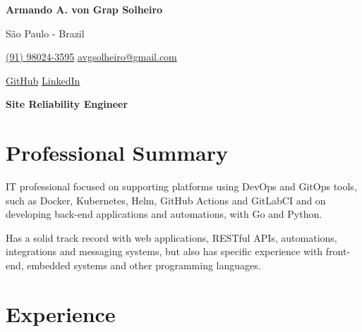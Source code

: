 \documentclass[a4paper,10pt]{article}
\begin{document}

\noindent
\begin{minipage}[t]{0.5\textwidth}
\textbf{\Large Armando A. von Grap Solheiro}

\vspace{0.4em}

\end{minipage}%
\begin{minipage}[t]{0.5\textwidth}
\raggedleft

São Paulo - Brazil

{\color{blue}} \href{tel:+5591980243595}{\faPhone \space (91) 98024-3595}
{\color{blue}} \href{mailto:avgsolheiro@gmail.com}{\faEnvelope \space avgsolheiro@gmail.com}

\vspace{0.2em}
 \quad
{\color{blue}} \href{https://github.com/asolheiro}{\faGithub \space GitHub} \quad
{\color{blue}} \href{https://www.linkedin.com/in/armandosolheiro/}{\faLinkedin \space LinkedIn} \\
\end{minipage}

\vspace{1em}

\begin{center}
    \textbf{\Large Site Reliability Engineer}
\end{center}
\vspace{0.5em}

\section*{Professional Summary}

IT professional focused on supporting platforms using DevOps and GitOps tools, such as Docker, Kubernetes, Helm, GitHub Actions and GitLabCI and on developing back-end applications and automations, with Go and Python.

Has a solid track record with web applications, RESTful APIs, automations, integrations and messaging systems, but also has specific experience with front-end, embedded systems and other programming languages.

\vspace{0.6em}

\vspace{0.5em}

\section*{Experience}
\end{document}

